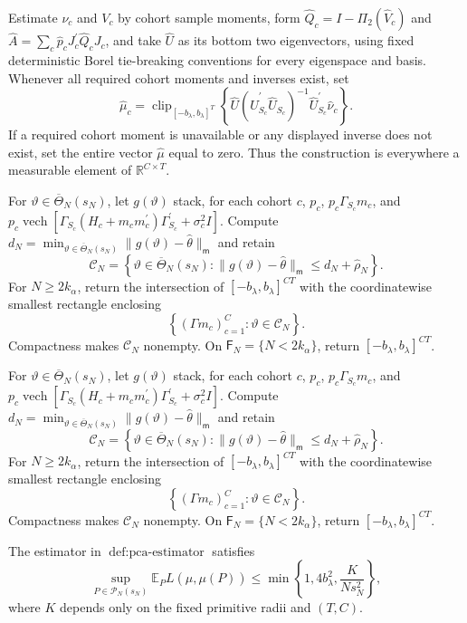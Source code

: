 Estimate \(\nu_c\) and \(V_c\) by cohort sample moments, form \(\widehat Q_c=I-\Pi_2(\widehat V_c)\) and \(\widehat A=\sum_c\widehat p_cJ_c^{\prime}\widehat Q_cJ_c\), and take \(\widehat U\) as its bottom two eigenvectors, using fixed deterministic Borel tie-breaking conventions for every eigenspace and basis. Whenever all required cohort moments and inverses exist, set
\[
\widehat\mu_c=\operatorname{clip}_{[-b_\lambda,b_\lambda]^T}\!\left\{\widehat U(\widehat U_{S_c}^{\prime}\widehat U_{S_c})^{-1}\widehat U_{S_c}^{\prime}\widehat\nu_c\right\}.
\]
If a required cohort moment is unavailable or any displayed inverse does not exist, set the entire vector \(\widehat\mu\) equal to zero. Thus the construction is everywhere a measurable element of \(\mathbb R^{C\times T}\).

For \(\vartheta\in\overline\Theta_N(s_N)\), let \(g(\vartheta)\) stack, for each cohort \(c\), \(p_c\), \(p_c\Gamma_{S_c}m_c\), and \(p_c\operatorname{vech}[\Gamma_{S_c}(H_c+m_cm_c^{\prime})\Gamma_{S_c}^{\prime}+\sigma_c^2I]\). Compute \(d_N=\min_{\vartheta\in\overline\Theta_N(s_N)}\|g(\vartheta)-\widehat\theta\|_{\mathsf m}\) and retain
\[
\mathcal C_N=\left\{\vartheta\in\overline\Theta_N(s_N):
\|g(\vartheta)-\widehat\theta\|_{\mathsf m}
\le d_N+\widehat\rho_N\right\}.
\]
For \(N\ge2k_\alpha\), return the intersection of \([-b_\lambda,b_\lambda]^{CT}\) with the coordinatewise smallest rectangle enclosing
\[
\left\{(\Gamma m_c)_{c=1}^C:\vartheta\in\mathcal C_N\right\}.
\]
Compactness makes \(\mathcal C_N\) nonempty. On \(\mathsf F_N=\{N<2k_\alpha\}\), return \([-b_\lambda,b_\lambda]^{CT}\).

For \(\vartheta\in\overline\Theta_N(s_N)\), let \(g(\vartheta)\) stack, for each cohort \(c\), \(p_c\), \(p_c\Gamma_{S_c}m_c\), and \(p_c\operatorname{vech}[\Gamma_{S_c}(H_c+m_cm_c^{\prime})\Gamma_{S_c}^{\prime}+\sigma_c^2I]\). Compute \(d_N=\min_{\vartheta\in\overline\Theta_N(s_N)}\|g(\vartheta)-\widehat\theta\|_{\mathsf m}\) and retain
\[
\mathcal C_N=\left\{\vartheta\in\overline\Theta_N(s_N):
\|g(\vartheta)-\widehat\theta\|_{\mathsf m}
\le d_N+\widehat\rho_N\right\}.
\]
For \(N\ge2k_\alpha\), return the intersection of \([-b_\lambda,b_\lambda]^{CT}\) with the coordinatewise smallest rectangle enclosing
\[
\left\{(\Gamma m_c)_{c=1}^C:\vartheta\in\mathcal C_N\right\}.
\]
Compactness makes \(\mathcal C_N\) nonempty. On \(\mathsf F_N=\{N<2k_\alpha\}\), return \([-b_\lambda,b_\lambda]^{CT}\).

The estimator in \(\operatorname{def:pca\text{-}estimator}\) satisfies
\[
\sup_{P\in\mathcal P_N(s_N)}
\mathbb E_P L(\widehat\mu,\mu(P))
\le \min\!\left\{1,4b_\lambda^2,\frac{K}{Ns_N^2}\right\},
\]
where \(K\) depends only on the fixed primitive radii and \((T,C)\).

